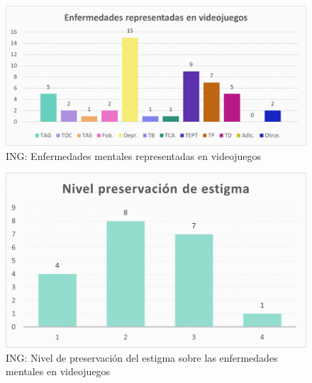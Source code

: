 \documentclass[12pt, a4paper,twoside,titlepage]{book}
\begin{document}
\begin{figure}
    \centering
    \includegraphics[width=.8\linewidth]{ANEXO ING/13AnexINGEnfvid}
    \caption{ING: Enfermedades mentales representadas en videojuegos}
    \label{fig:INGEnf}
\end{figure}


\begin{figure}
    \centering
    \includegraphics[width=.8\linewidth]{ANEXO ING/14AnexINGEst}
    \caption{ING: Nivel de preservación del estigma sobre las enfermedades mentales en videojuegos}
    \label{fig:INGEstigma}
\end{figure}
\end{document}
